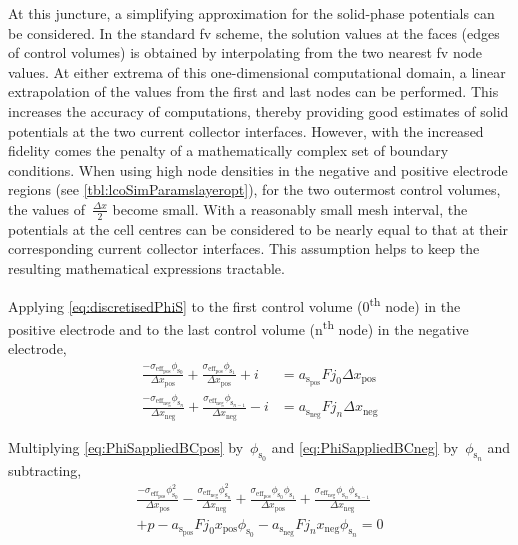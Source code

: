     At this juncture, a simplifying approximation for the solid-phase potentials
    can be considered.  In the standard \gls{fv} scheme, the  solution values at
    the faces (edges  of control volumes) is obtained by  interpolating from the
    two nearest \gls{fv} node values.  At either extrema of this one-dimensional
    computational  domain,  a  linear  extrapolation  of  the  values  from  the
    first  and last  nodes  can be  performed. This  increases  the accuracy  of
    computations, thereby  providing good estimates  of solid potentials  at the
    two current collector interfaces. However, with the increased fidelity comes
    the  penalty  of  a  mathematically  complex  set  of  boundary  conditions.
    When  using high  node  densities  in the  negative  and positive  electrode
    regions (see \cref{tbl:lcoSimParamslayeropt}), for the two outermost control
    volumes, the values of~$\frac{\Delta x}{2}$ become small. With a reasonably
    small mesh interval, the potentials at the cell centres can be considered to
    be nearly equal to that at their corresponding current collector interfaces.
    This  assumption  helps  to  keep  the  resulting  mathematical  expressions
    tractable.

    Applying    \cref{eq:discretisedPhiS}    to    the    first    control    volume
    (0\textsuperscript{th} node) in  the positive electrode and to  the last control
    volume (n\textsuperscript{th} node) in the negative electrode,
    \begin{align}
	    \frac{-\sigma_{\text{eff}_\text{pos}} \phi_{\text{s}_0}}{\Delta x_\text{pos}} + \frac{\sigma_{\text{eff}_\text{pos}} \phi_{\text{s}_1}}{\Delta x_\text{pos}} + i &= a_{\text{s}_\text{pos}} F j_0 \Delta x_\text{pos}\label{eq:PhiSappliedBCpos}\\
	    \frac{-\sigma_{\text{eff}_\text{neg}} \phi_{\text{s}_n}}{\Delta x_\text{neg}} + \frac{\sigma_{\text{eff}_\text{neg}} \phi_{\text{s}_{n-1}}}{\Delta x_\text{neg}} - i &= a_{\text{s}_\text{neg}} F j_n \Delta x_\text{neg}\label{eq:PhiSappliedBCneg}
    \end{align}

    Multiplying    \cref{eq:PhiSappliedBCpos}    by~$\phi_{\text{s}_0}$    and
    \cref{eq:PhiSappliedBCneg} by~$\phi_{\text{s}_n}$ and subtracting,
    \begin{multline} \label{eq:pinputBCcomplete}
        \frac{-\sigma_{\text{eff}_\text{pos}} \phi^2_{\text{s}_0}}{\Delta x_\text{pos}} -
        \frac{\sigma_{\text{eff}_\text{neg}} \phi^2_{\text{s}_n}}{\Delta x_\text{neg}} +
        \frac{\sigma_{\text{eff}_\text{pos}} \phi_{\text{s}_0} \phi_{\text{s}_1}}{\Delta x_\text{pos}} +
        \frac{\sigma_{\text{eff}_\text{neg}} \phi_{\text{s}_n} \phi_{\text{s}_{n-1}}}{\Delta x_\text{neg}} \\+ p -
        a_{\text{s}_\text{pos}} F j_0 x_\text{pos} \phi_{\text{s}_0} - a_{\text{s}_\text{neg}} F j_n x_\text{neg}
        \phi_{\text{s}_n} = 0
    \end{multline}

